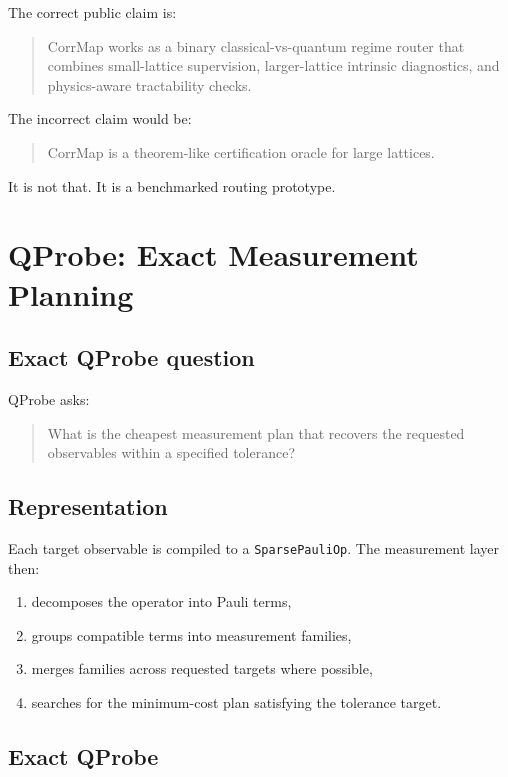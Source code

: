 \documentclass[11pt]{article}
\begin{document}
The correct public claim is:

\begin{quote}
CorrMap works as a binary classical-vs-quantum regime router that combines small-lattice supervision, larger-lattice intrinsic diagnostics, and physics-aware tractability checks.
\end{quote}

The incorrect claim would be:

\begin{quote}
CorrMap is a theorem-like certification oracle for large lattices.
\end{quote}

It is not that. It is a benchmarked routing prototype.

\section{QProbe: Exact Measurement Planning}

\subsection{Exact QProbe question}

QProbe asks:

\begin{quote}
What is the cheapest measurement plan that recovers the requested observables within a specified tolerance?
\end{quote}

\subsection{Representation}

Each target observable is compiled to a \verb|SparsePauliOp|. The measurement layer then:

\begin{enumerate}[label=\arabic*.]
\item decomposes the operator into Pauli terms,
\item groups compatible terms into measurement families,
\item merges families across requested targets where possible,
\item searches for the minimum-cost plan satisfying the tolerance target.
\end{enumerate}

\subsection{Exact QProbe}
\end{document}
